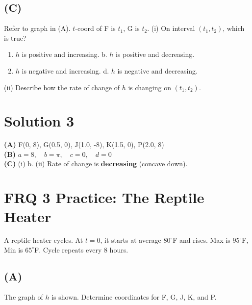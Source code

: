 \documentclass[12pt]{article}
\begin{document}
\subsection*{(C)}
Refer to graph in (A). $t$-coord of F is $t_1$, G is $t_2$.
(i) On interval $(t_1, t_2)$, which is true?
\begin{enumerate}[label=\alph*.]
    \item $h$ is positive and increasing. \hfill b. $h$ is positive and decreasing.
    \item $h$ is negative and increasing. \hfill d. $h$ is negative and decreasing.
\end{enumerate}
(ii) Describe how the rate of change of $h$ is changing on $(t_1, t_2)$.
\vspace{1.5cm}

\newpage
\section*{Solution 3}
\textbf{(A)} F(0, 8), G(0.5, 0), J(1.0, -8), K(1.5, 0), P(2.0, 8) \\
\textbf{(B)} $a = 8, \quad b = \pi, \quad c = 0, \quad d = 0$ \\
\textbf{(C)} (i) b. (ii) Rate of change is \textbf{decreasing} (concave down).

\newpage

\section*{FRQ 3 Practice: The Reptile Heater}
A reptile heater cycles. At $t=0$, it starts at average $80^\circ$F and rises. Max is $95^\circ$F, Min is $65^\circ$F. Cycle repeats every 8 hours.

\subsection*{(A)}
The graph of $h$ is shown. Determine coordinates for F, G, J, K, and P.

\begin{center}
\end{center}
\end{document}
